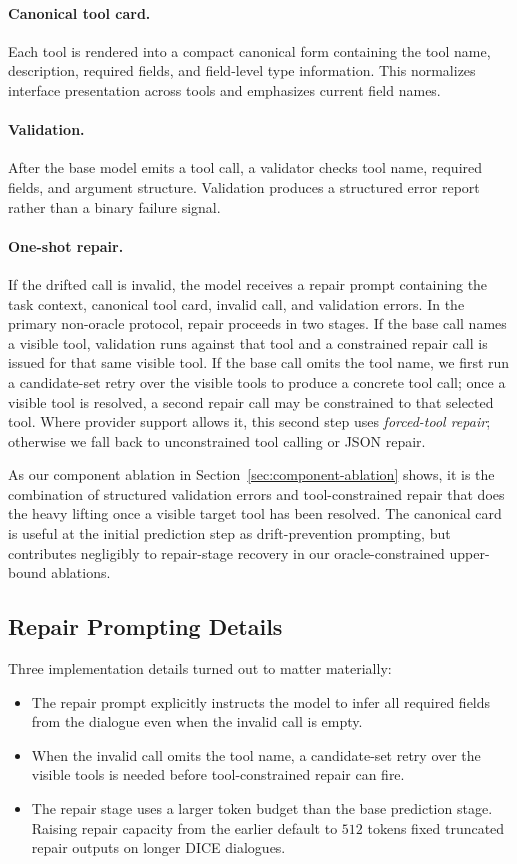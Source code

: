 \documentclass[runningheads]{llncs}
\begin{document}
\paragraph{Canonical tool card.}
Each tool is rendered into a compact canonical form containing the tool name,
description, required fields, and field-level type information. This normalizes
interface presentation across tools and emphasizes current field names.

\paragraph{Validation.}
After the base model emits a tool call, a validator checks tool name, required
fields, and argument structure. Validation produces a structured error report rather
than a binary failure signal.

\paragraph{One-shot repair.}
If the drifted call is invalid, the model receives a repair prompt containing the
task context, canonical tool card, invalid call, and validation errors. In the
primary non-oracle protocol, repair proceeds in two stages. If the base call names
a visible tool, validation runs against that tool and a constrained repair call is
issued for that same visible tool. If the base call omits the tool name, we first
run a candidate-set retry over the visible tools to produce a concrete tool call;
once a visible tool is resolved, a second repair call may be constrained to that
selected tool. Where provider support allows it, this second step uses
\emph{forced-tool repair}; otherwise we fall back to unconstrained tool calling or
JSON repair.

As our component ablation in Section~\ref{sec:component-ablation} shows, it is the
combination of structured validation errors and tool-constrained repair that does
the heavy lifting once a visible target tool has been resolved. The canonical card
is useful at the initial prediction step as drift-prevention prompting, but
contributes negligibly to repair-stage recovery in our oracle-constrained
upper-bound ablations.

\subsection{Repair Prompting Details}
Three implementation details turned out to matter materially:
\begin{itemize}
\item The repair prompt explicitly instructs the model to infer all required fields
from the dialogue even when the invalid call is empty.
\item When the invalid call omits the tool name, a candidate-set retry over the
visible tools is needed before tool-constrained repair can fire.
\item The repair stage uses a larger token budget than the base prediction stage.
Raising repair capacity from the earlier default to $512$ tokens fixed truncated
repair outputs on longer DICE dialogues.
\end{itemize}
\end{document}
